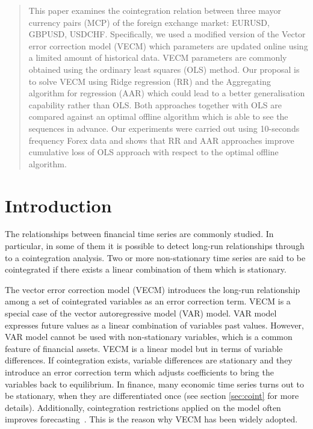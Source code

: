 \documentclass[twocolumn]{svjour3}          %
\begin{document}
\begin{abstract}

This paper examines the cointegration relation between three mayor currency pairs (MCP) of the foreign exchange market:  EURUSD, GBPUSD, USDCHF. Specifically, we used a modified version of the Vector error correction model (VECM) which parameters are updated online using a limited amount of historical data.
VECM parameters are commonly obtained using the
ordinary least squares (OLS) method. Our proposal is to solve VECM using Ridge regression (RR) and the Aggregating algorithm for regression (AAR) which could lead to a better generalisation capability rather than OLS. Both approaches together with OLS are compared against an optimal offline algorithm which is able to see the sequences in advance.
Our experiments were carried out using 10-seconds frequency Forex data and shows that RR and AAR approaches improve cumulative loss of OLS approach with respect to the optimal offline algorithm.



\end{abstract}

\section{Introduction}
\label{sec:introduction}

The relationships between financial time series are commonly studied. In particular, in some of them
it is possible to detect long-run relationships through to a cointegration analysis. Two or more non-stationary time series are said to be cointegrated if there exists a linear combination of them which is stationary.

The vector error correction model (VECM) introduces the long-run relationship among a set of cointegrated variables
as an error correction term. VECM is a special case of the vector autoregressive
model (VAR) model. VAR model expresses future values as a linear combination of
variables past values.  However, VAR model cannot be used with non-stationary
variables, which is a common feature of financial assets. VECM is a linear model
but in terms of variable differences. If cointegration exists, variable
differences are stationary and they introduce an error correction term which
adjusts coefficients to bring the variables back to equilibrium. In finance,
many economic time series turns out to be stationary, when they are differentiated once (see section \ref{sec:coint} for more details). Additionally, cointegration restrictions applied on the model often improves forecasting~\cite{duy1998}. This is the reason why VECM has been widely adopted.
\end{document}
